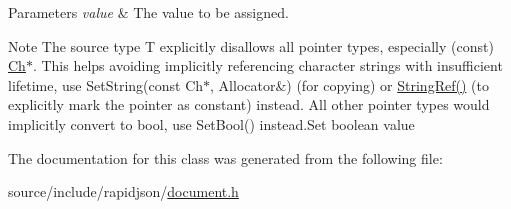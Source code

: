 \begin{DoxyParams}{Parameters}
{\em value} & The value to be assigned.\\
\hline
\end{DoxyParams}
\begin{DoxyNote}{Note}
The source type {\ttfamily T} explicitly disallows all pointer types, especially ({\ttfamily const}) \hyperlink{class_generic_value_ade0e0ce64ccd5d852da57a35e720bafb}{Ch}$\ast$. This helps avoiding implicitly referencing character strings with insufficient lifetime, use Set\+String(const Ch$\ast$, Allocator\&) (for copying) or \hyperlink{document_8h_aa6b9fd9f6aa49405a574c362ba9af6b5}{String\+Ref()} (to explicitly mark the pointer as constant) instead. All other pointer types would implicitly convert to {\ttfamily bool}, use Set\+Bool() instead.\+Set boolean value 
\end{DoxyNote}


The documentation for this class was generated from the following file\+:\begin{DoxyCompactItemize}
\item 
source/include/rapidjson/\hyperlink{document_8h}{document.\+h}\end{DoxyCompactItemize}
